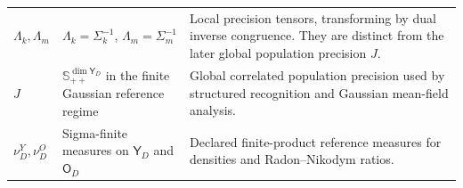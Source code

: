\begin{longtable}{>{\raggedright\arraybackslash}p{}>{\raggedright\arraybackslash}p{}>{\raggedright\arraybackslash}p{}}
\(\Lambda_k,\Lambda_m\) &
\(\Lambda_k=\Sigma_k^{-1}\), \(\Lambda_m=\Sigma_m^{-1}\) &
Local precision tensors, transforming by dual inverse congruence. They are distinct from the later global population precision \(J\).\\
\(J\) &
\(\mathbb S_{++}^{\dim\mathsf Y_D}\) in the finite Gaussian reference regime &
Global correlated population precision used by structured recognition and Gaussian mean-field analysis.\\
\(\nu_D^Y,\nu_D^O\) &
Sigma-finite measures on \(\mathsf Y_D\) and \(\mathsf O_D\) &
Declared finite-product reference measures for densities and Radon--Nikodym ratios.\\
\end{longtable}
\normalsize
